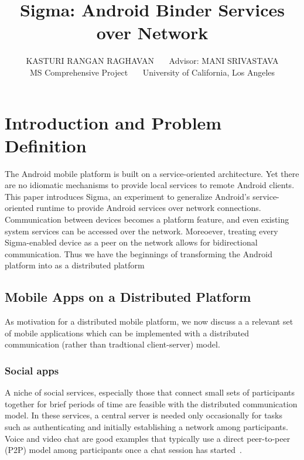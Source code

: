 \documentclass[prodmode]{acmlarge}
\title{Sigma: Android Binder Services over Network}
\author{KASTURI RANGAN RAGHAVAN~~~
Advisor: MANI SRIVASTAVA\\
MS Comprehensive Project~~~
University of California, Los Angeles
}
\begin{document}
\pagestyle{empty}
\maketitle

\tableofcontents

\clearpage
\section{Introduction and Problem Definition}

The Android mobile platform is built on a service-oriented architecture. Yet there are no idiomatic mechanisms to provide local services to remote Android clients. This paper introduces Sigma, an experiment to generalize Android's service-oriented runtime to provide Android services over network connections. Communication between devices becomes a platform feature, and even existing system services can be accessed over the network. Moreoever, treating every Sigma-enabled device as a peer on the network allows for bidirectional communication. Thus we have the beginnings of transforming the Android platform into as a distributed platform

\subsection{Mobile Apps on a Distributed Platform}
As motivation for a distributed mobile platform, we now discuss a a relevant set of mobile applications which can be implemented with a distributed communication (rather than tradtional client-server) model.

\subsubsection{Social apps}
A niche of social services, especially those that connect small sets of participants together for brief periods of time are feasible with the distributed communication model. In these services, a central server is needed only occasionally for tasks such as authenticating and initially establishing a network among participants. Voice and video chat are good examples that typically use a direct peer-to-peer (P2P) model among participants once a chat session has started~\cite{SkypeStudy,GoogleTalkLibrary}.
\end{document}
